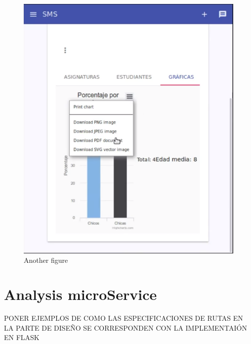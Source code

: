 \begin{figure}[H]
\begin{minipage}{.5\textwidth}
  \includegraphics[scale=0.3]{img/snaps/teacher_profile_graphics.png}
  \caption{Another figure}
\end{minipage}
\end{figure}

\section{Analysis microService}

PONER EJEMPLOS DE COMO LAS ESPECIFICACIONES DE RUTAS EN LA PARTE DE DISEÑO
SE CORRESPONDEN CON LA IMPLEMENTAIÓN EN FLASK
